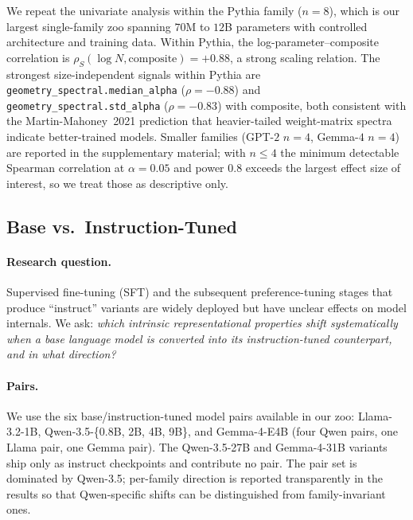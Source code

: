 \documentclass[preprint]{neurips_2025}
\begin{document}
We repeat the univariate analysis within the Pythia family ($n=8$), which is our largest single-family zoo spanning $70$M to $12$B parameters with controlled architecture and training data.
Within Pythia, the log-parameter--composite correlation is $\rho_S(\log N, \text{composite}) = +0.88$, a strong scaling relation.
The strongest size-independent signals within Pythia are \texttt{geometry\_spectral.median\_alpha} ($\rho = -0.88$) and \texttt{geometry\_spectral.std\_alpha} ($\rho = -0.83$) with composite, both consistent with the Martin-Mahoney~2021 prediction that heavier-tailed weight-matrix spectra indicate better-trained models.
Smaller families (GPT-$2$ $n=4$, Gemma-$4$ $n=4$) are reported in the supplementary material; with $n \leq 4$ the minimum detectable Spearman correlation at $\alpha = 0.05$ and power $0.8$ exceeds the largest effect size of interest, so we treat those as descriptive only.

\subsection{Base vs.\ Instruction-Tuned}
\label{sec:instruct}

\paragraph{Research question.}
Supervised fine-tuning (SFT) and the subsequent preference-tuning stages that produce ``instruct'' variants are widely deployed but have unclear effects on model internals. We ask: \emph{which intrinsic representational properties shift systematically when a base language model is converted into its instruction-tuned counterpart, and in what direction?}

\paragraph{Pairs.}
We use the six base/instruction-tuned model pairs available in our zoo: Llama-3.2-1B, Qwen-3.5-\{0.8B, 2B, 4B, 9B\}, and Gemma-4-E4B (four Qwen pairs, one Llama pair, one Gemma pair). The Qwen-3.5-27B and Gemma-4-31B variants ship only as instruct checkpoints and contribute no pair. The pair set is dominated by Qwen-3.5; per-family direction is reported transparently in the results so that Qwen-specific shifts can be distinguished from family-invariant ones.
\end{document}
